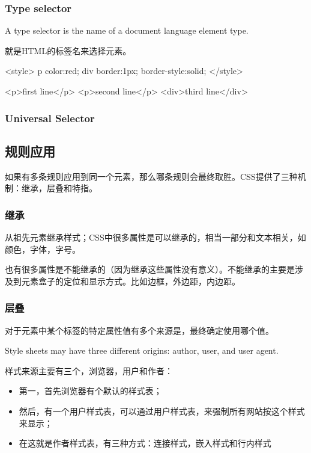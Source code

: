\subsubsection{Type selector}

A type selector is the name of a document language element type.

就是HTML的标签名来选择元素。

\begin{CSS}
<style>
p {color:red;}
div {border:1px; border-style:solid;}
</style>

<p>first line</p>
<p>second line</p>
<div>third line</div>
\end{CSS}


\subsubsection{Universal Selector}



\subsection{规则应用}

如果有多条规则应用到同一个元素，那么哪条规则会最终取胜。CSS提供了三种机制：继承，层叠和特指。


\subsubsection{继承}

从祖先元素继承样式；CSS中很多属性是可以继承的，相当一部分和文本相关，如颜色，字体，字号。

也有很多属性是不能继承的（因为继承这些属性没有意义）。不能继承的主要是涉及到元素盒子的定位和显示方式。比如边框，外边距，内边距。

\subsubsection{层叠}

对于元素中某个标签的特定属性值有多个来源是，最终确定使用哪个值。

Style sheets may have three different origins: author, user, and user agent.

样式来源主要有三个，浏览器，用户和作者：
\begin{itemize}
\item 第一，首先浏览器有个默认的样式表；
\item 然后，有一个用户样式表，可以通过用户样式表，来强制所有网站按这个样式来显示；
\item 在这就是作者样式表，有三种方式：连接样式，嵌入样式和行内样式
\end{itemize}

